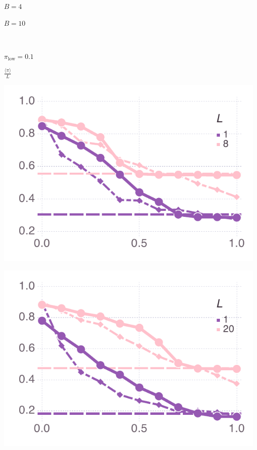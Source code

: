 \documentclass[varwidth=true,crop=false]{standalone}
\newcommand{\pisub}[1]{\pi_{\mathrm{#1}}}
\newcommand{\pilow}{\pisub{low}}
\newcommand{\meanvar}[1]{\langle #1 \rangle}
\newcommand{\meanpi}{\meanvar{\pi}}
\begin{document}
    \begin{minipage}{3.75in}
      \centering
      {\hspace{5.25em}\huge $B = 4$}
    \end{minipage}%
    \begin{minipage}{3.75in}
      \centering
      {\hspace{2.0em}\huge $B = 10$}
    \end{minipage}~\\

    \begin{minipage}{3.75in}
    \begin{rotate}{90}
      {\parbox{2.5in}{
          \centering
          \vspace{-2.5em} {\huge$ \pilow = 0.1$} \\
          {\begin{rotate}{-90}{\huge $\frac{\meanpi}{L}$}\hspace{3em}\end{rotate}}
      }}
    \end{rotate}%
    \hspace{2em}
      \includegraphics[width=\textwidth]{Figures/mean_prev_net_payoff_over_u_lowpayoff=0.1_nbehaviors=4.pdf}
    \end{minipage}\noindent\begin{minipage}{3.75in}%
      \includegraphics[width=\textwidth]{Figures/mean_prev_net_payoff_over_u_lowpayoff=0.1_nbehaviors=10.pdf}

\end{minipage}
\end{document}

